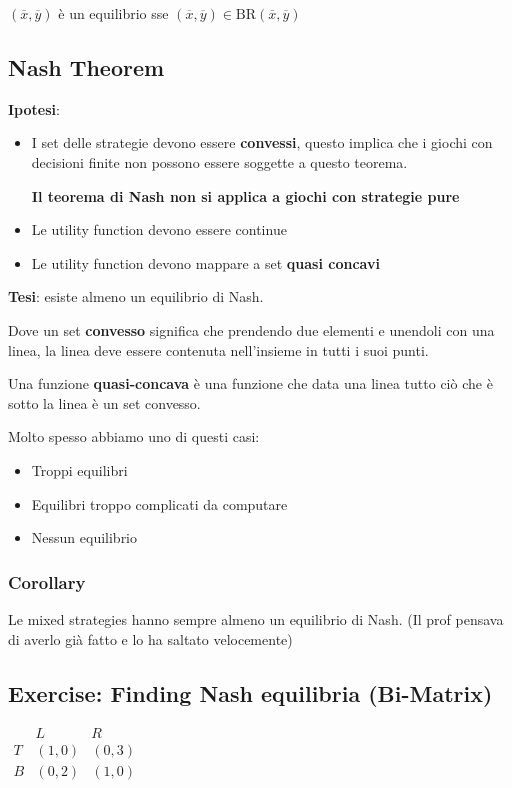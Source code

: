 \documentclass[10pt,a4paper]{report}
\begin{document}
        $(\overline{x}, \overline{y})$ è un equilibrio sse $(\overline{x}, \overline{y}) \in \text{BR}(\overline{x}, \overline{y})$

        \subsection{Nash Theorem}

        \textbf{Ipotesi}:
        \begin{itemize}
            \item I set delle strategie devono essere \textbf{convessi}, questo implica che i giochi con decisioni finite non possono essere soggette a questo teorema.
                
                \textbf{Il teorema di Nash non si applica a giochi con strategie pure}
            \item Le utility function devono essere continue
            \item Le utility function devono mappare a set \textbf{quasi concavi}
        \end{itemize}
        
        \textbf{Tesi}: esiste almeno un equilibrio di Nash.

        Dove un set \textbf{convesso} significa che prendendo due elementi e unendoli con una linea, la linea deve essere contenuta nell'insieme in tutti i suoi punti.

        Una funzione \textbf{quasi-concava} è una funzione che data una linea tutto ciò che è sotto la linea è un set convesso.

        Molto spesso abbiamo uno di questi casi:
        \begin{itemize}
            \item Troppi equilibri
            \item Equilibri troppo complicati da computare
            \item Nessun equilibrio
        \end{itemize}

        \subsubsection{Corollary}
        Le mixed strategies hanno sempre almeno un equilibrio di Nash. (Il prof pensava di averlo già fatto e lo ha saltato velocemente)

        \subsection{Exercise: Finding Nash equilibria (Bi-Matrix)}
        $
        \begin{matrix}
            & L & R \\
            T & (1,0) & (0,3) \\
            B & (0,2) & (1,0) 
        \end{matrix}
        $
\end{document}

